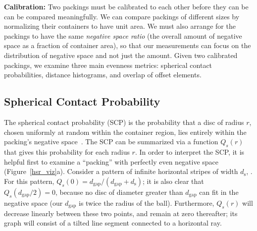\textbf{Calibration:}
Two packings must be calibrated to each other before they can be
can be compared meaningfully.  
We can compare packings of different sizes by normalizing their containers to
have unit area.  We must also arrange for the packings to have the same
\textit{negative space ratio} 
(the overall amount of negative space as a 
fraction of container area), so that our measurements can focus on the
distribution of negative space and not just the amount.  Given two
calibrated packings, we examine three main evenness metrics:
spherical contact probabilities,
distance histograms,
and overlap of offset elements. 


\subsection{Spherical Contact Probability}

The spherical contact probability (SCP) is the probability that a 
disc of radius $r$, chosen
uniformly at random within the container region, lies entirely within the 
packing's negative space~\cite{Chiu2013}.
The SCP can be summarized via a function $Q_s(r)$ that gives this 
probability for each radius $r$.
In order to interpret the SCP, it is helpful first to
examine a ``packing'' with perfectly even negative space (Figure~\ref{hsr_viz}a).
Consider a pattern of infinite horizontal stripes of width $d_\mathrm{s}$,
.  For this pattern,
$Q_s(0)=d_\mathrm{gap}/(d_\mathrm{gap}+d_\mathrm{s})$; it is also
clear that $Q_s(d_\mathrm{gap}/2)=0$, because no disc of diameter greater
than $d_\mathrm{gap}$ can fit in the negative space
(our $d_\mathrm{gap}$ is twice the radius of the ball).
Furthermore,
$Q_s(r)$ will decrease linearly between these two points, and remain
at zero thereafter; its graph will consist of a tilted line segment
connected to a horizontal ray.




